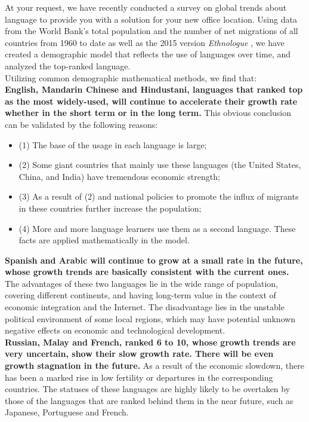 \documentclass{mcmthesis}
\begin{document}
At your request, we have recently conducted a survey on global trends about language to provide you with a solution for your new office location. Using data from the World Bank's total population and the number of net migrations of all countries from 1960 to date as well as the 2015 version \textit{Ethnologue} , we have created a demographic model that reflects the use of languages over time, and analyzed the top-ranked language.\\
\hspace*{8mm}Utilizing common demographic mathematical methods, we find that:\\\hspace*{8mm}\textbf{English, Mandarin Chinese and Hindustani, languages that ranked top as the most widely-used, will continue to accelerate their growth rate whether in the short term or in the long term.} This obvious conclusion can be validated by the following reasons: 
\begin{itemize}
\item(1) The base of the usage in each language is large;
\item(2) Some giant countries that mainly use these languages (the United States, China, and India) have tremendous economic strength;
\item(3) As a result of (2) and national policies to promote the influx of migrants in these countries further increase the population; 
\item(4) More and more language learners use them as a second language. These facts are applied mathematically in the model.
\end{itemize}
\hspace*{8mm}\textbf{Spanish and Arabic will continue to grow at a small rate in the future, whose growth trends are basically consistent with the current ones.} The advantages of these two languages lie in the wide range of population, covering different continents, and having long-term value in the context of economic integration and the Internet. The disadvantage lies in the unstable political environment of some local regions, which may have potential unknown negative effects on economic and technological development. \\
\hspace*{8mm}\textbf{Russian, Malay and French, ranked 6 to 10, whose growth trends are very uncertain, show their slow growth rate. There will be even growth stagnation in the future. }As a result of the economic slowdown, there has been a marked rise in low fertility or departures in the corresponding countries. The statuses of these languages are highly likely to be overtaken by those of the languages that are ranked behind them in the near future, such as Japanese, Portuguese and French.\\
\end{document}
